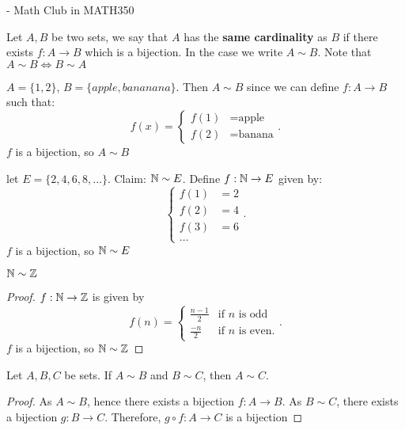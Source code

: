 
- Math Club in MATH350

\begin{definition}
	Let $A, B$ be two sets, we say that $A$ has the \textbf{same cardinality} as $B$ if there exists $f:A\to B $ which is a bijection. In the case we write $A \sim B$. Note that $A\sim B \iff B \sim A$
\end{definition}


\begin{eg}
	$A = \{1, 2\}$, $B= \{apple, bananana\}$. Then $A \sim B$ since we can define $f: A \to B$ such that:
	\[
	f\left( x \right) =
	\begin{cases}
		f\left( 1 \right) & = \text{apple}\\
		f\left( 2 \right) & = \text{banana}
	\end{cases}
	.\] 
	$f$ is a bijection, so $A \sim B$
\end{eg}

\begin{eg}
	let $E = \{2, 4, 6, 8, \ldots\}$. Claim: $\mathbb{N} \sim E$. Define $f: \mathbb{N} \to E$ given by: 
	\[
		\begin{cases}
			f\left( 1 \right) & = 2 \\
			f\left( 2 \right) & = 4 \\
			f\left( 3 \right) & = 6 \\
			\ldots
		\end{cases}
	.\] 
	$f$ is a bijection, so $\mathbb{N} \sim E$
\end{eg}

\begin{eg}
	$\mathbb{N} \sim \mathbb{Z}$
\end{eg}

\begin{proof}
	$f: \mathbb{N} \to \mathbb{Z}$ is given by 
	\[
	f\left( n \right) = 	
	\begin{cases}
		\frac{n-1}{2} & \text{if $n$ is odd}\\
		\frac{-n}{2} & \text{if $n$ is even}.
	
	\end{cases}
	.\] 
	$f$ is a bijection, so $\mathbb{N} \sim \mathbb{Z}$
\end{proof}

\begin{theorem}
	Let $A, B, C$ be sets. If $A \sim B$ and $B \sim C$, then $A \sim C$.
\end{theorem}

\begin{proof}
	As $A \sim B$, hence there exists a bijection $f:A \to B$. As $B \sim C$, there exists a bijection $g:B \to C$. Therefore, $g \circ f: A \to C$ is a bijection
\end{proof}



